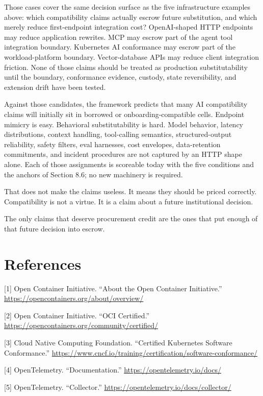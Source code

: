 \documentclass[11pt]{article}
\begin{document}
Those cases cover the same decision surface as the five infrastructure examples above: which compatibility claims actually escrow future substitution, and which merely reduce first-endpoint integration cost? OpenAI-shaped HTTP endpoints may reduce application rewrites. MCP may escrow part of the agent tool integration boundary. Kubernetes AI conformance may escrow part of the workload-platform boundary. Vector-database APIs may reduce client integration friction. None of those claims should be treated as production substitutability until the boundary, conformance evidence, custody, state reversibility, and extension drift have been tested.

Against those candidates, the framework predicts that many AI compatibility claims will initially sit in borrowed or onboarding-compatible cells. Endpoint mimicry is easy. Behavioral substitutability is hard. Model behavior, latency distributions, context handling, tool-calling semantics, structured-output reliability, safety filters, eval harnesses, cost envelopes, data-retention commitments, and incident procedures are not captured by an HTTP shape alone. Each of those assignments is scoreable today with the five conditions and the anchors of Section 8.6; no new machinery is required.

That does not make the claims useless. It means they should be priced correctly. Compatibility is not a virtue. It is a claim about a future institutional decision.

The only claims that deserve procurement credit are the ones that put enough of that future decision into escrow.

\section{References}\label{references}

{[}1{]} Open Container Initiative. ``About the Open Container Initiative.'' \url{https://opencontainers.org/about/overview/}

{[}2{]} Open Container Initiative. ``OCI Certified.'' \url{https://opencontainers.org/community/certified/}

{[}3{]} Cloud Native Computing Foundation. ``Certified Kubernetes Software Conformance.'' \url{https://www.cncf.io/training/certification/software-conformance/}

{[}4{]} OpenTelemetry. ``Documentation.'' \url{https://opentelemetry.io/docs/} 

{[}5{]} OpenTelemetry. ``Collector.'' \url{https://opentelemetry.io/docs/collector/}
\end{document}
